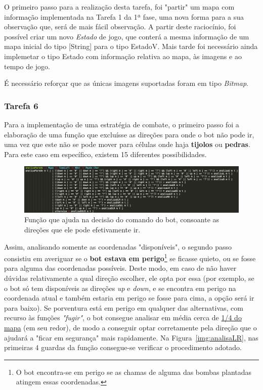 \documentclass[a4paper]{article}
\begin{document}
O primeiro passo para a realização desta tarefa, foi "partir" um mapa com informação 
implementada na Tarefa 1 da 1ª fase, 
uma nova forma para a sua observação que, será de mais fácil observação. A partir deste 
raciocínio, foi possível criar 
um novo \emph{Estado} de jogo, que conterá a mesma informação de um mapa inicial do 
tipo \textsf{[String]} para o tipo
\textsf{EstadoV}. Mais tarde foi necessário ainda implemetar o tipo \textsf{Estado} com 
informação relativa ao mapa, às imagens e ao tempo de jogo. 

É necessário reforçar que as únicas imagens suportadas foram em tipo \emph{Bitmap}. 

\subsubsection{Tarefa 6}
\label{sec:solucaoTarefa6}

Para a implementação de uma estratégia de combate, o primeiro passo foi a elaboração
de uma função que excluísse as direções para onde o bot não pode ir, uma vez que este não se 
pode mover para células onde haja \textbf{tijolos} ou \textbf{pedras}. Para este caso em 
específico, existem 15 diferentes possibilidades.

\begin{figure}[H]
\centering 
\includegraphics[scale=0.50]{analisaParede}
\caption{Função que ajuda na decisão do comando do bot, consoante as direções que ele pode efetivamente ir.}
\end{figure}

Assim, analisando somente as coordenadas "disponíveis", o segundo passo consistiu em
averiguar se o \textbf{bot estava em perigo}\footnote{O bot encontra-se em perigo se as 
  chamas de alguma das bombas plantadas atingem essas coordenadas.} se ficasse quieto, 
ou se fosse para alguma das coordenadas possíveis. Deste modo, em caso de não haver dúvidas 
relativamente a qual direção escolher, ele opta por essa (por exemplo, se o bot só tem disponíveis 
as direções \emph{up} e \emph{down}, e se encontra em perigo na coordenada 
atual e também estaria em perigo se fosse para cima, a opção será ir para baixo). Se porventura está 
em perigo em qualquer das alternativas, com recurso às funções \emph{"fugir"}, o bot consegue analisar 
em média cerca de \underline{1/4 do mapa} (em seu redor), de modo a conseguir optar corretamente pela 
direção que o ajudará a "ficar em segurança" mais rapidamente. Na Figura~\ref{img:analisaLR}, nas 
primeiras 4 guardas da função consegue-se verificar o procedimento adotado.
\end{document}
